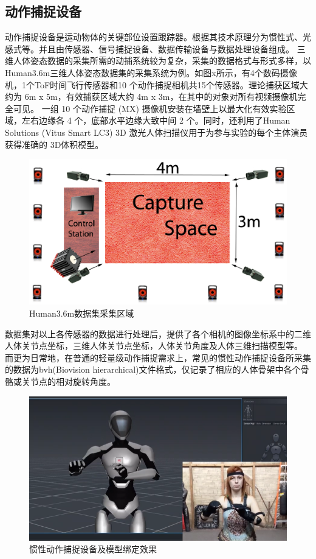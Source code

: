 \subsection{动作捕捉设备}{}
动作捕捉设备是运动物体的关键部位设置跟踪器。根据其技术原理分为惯性式、光感式等。并且由传感器、信号捕捉设备、数据传输设备与数据处理设备组成。
三维人体姿态数据的采集所需的动捕系统较为复杂，采集的数据格式与形式多样，以Human3.6m三维人体姿态数据集的采集系统为例。如图x所示，有4个数码摄像机，1个ToF时间飞行传感器和10 个动作捕捉相机共15个传感器。理论捕获区域大约为 6m x 5m，有效捕获区域大约 4m x 3m，在其中的对象对所有视频摄像机完全可见。
一组 10 个动作捕捉 (MX) 摄像机安装在墙壁上以最大化有效实验区域，左右边缘各 4 个，底部水平边缘大致中间 2 个。同时，还利用了Human Solutions (Vitus Smart LC3) 3D 激光人体扫描仪用于为参与实验的每个主体演员获得准确的 3D体积模型。
\begin{figure}[h]
	\centering
	\includegraphics[scale=0.4]{figures/13.png}
	\caption{Human3.6m数据集采集区域}
	\label{fig:f13}
\end{figure}
数据集对以上各传感器的数据进行处理后，提供了各个相机的图像坐标系中的二维人体关节点坐标，三维人体关节点坐标，人体关节角度及人体三维扫描模型等。
而更为日常地，在普通的轻量级动作捕捉需求上，常见的惯性动作捕捉设备所采集的数据为bvh(Biovision hierarchical)文件格式，仅记录了相应的人体骨架中各个骨骼或关节点的相对旋转角度。
\begin{figure}[h]
	\centering
	\includegraphics[scale=0.4]{figures/14.png}
	\caption{惯性动作捕捉设备及模型绑定效果}
	\label{fig:f14}
\end{figure}


